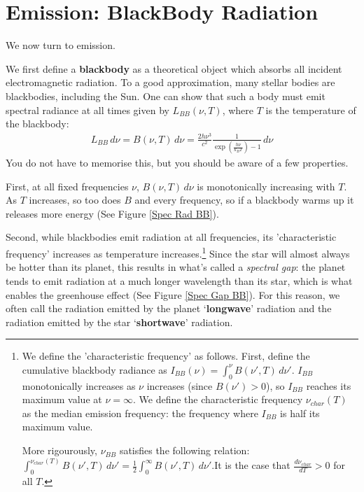 \section{Emission: BlackBody Radiation}

We now turn to emission.

We first define a \textbf{blackbody} as a theoretical object which absorbs all incident electromagnetic radiation. To a good approximation, many stellar bodies are blackbodies, including the Sun. One can show that such a body must emit spectral radiance at all times given by $L_{BB}(\nu,T)$, where $T$ is the temperature of the blackbody:
\begin{align}
    \boxed{L_{BB}\,d\nu=B(\nu,T)\,d\nu=\frac{2h\nu^3}{c^2}\frac{1}{\exp\left( \frac{h\nu}{k_BT} \right)-1}\,d\nu}
\end{align}
You do not have to memorise this, but you should be aware of a few properties. 

First, at all fixed frequencies $\nu$, $B(\nu,T)\,d\nu$ is monotonically increasing with $T$. As $T$ increases, so too does $B$ and every frequency, so if a blackbody warms up it releases more energy (See Figure \ref{Spec Rad BB}).

Second, while blackbodies emit radiation at all frequencies, its 'characteristic frequency' increases as temperature increases.\footnote{
    We define the 'characteristic frequency' as follows. First, define the cumulative blackbody radiance as $I_{BB}(\nu)=\int_0^\nu B(\nu',T)\,d\nu'$. $I_{BB}$ monotonically increases as $\nu$ increases (since $B(\nu')>0$), so $I_{BB}$ reaches its maximum value at $\nu=\infty$. We define the characteristic frequency $\nu_{char}(T)$ as the median emission frequency: the frequency where $I_{BB}$ is half its maximum value. 
    
    More rigourously, $\nu_{BB}$ satisfies the following relation: $\int_0^{\nu_{char}(T)} B(\nu',T)\,d\nu'=\frac{1}{2}\int_0^\infty B(\nu',T)\,d\nu'$.\footnotemark  It is the case that $\frac{d\nu_{char}}{dT}>0$ for all $T$.
} 
Since the star will almost always be hotter than its planet, this results in what's called a \textit{spectral gap}: the planet tends to emit radiation at a much longer wavelength than its star, which is what enables the greenhouse effect (See Figure \ref{Spec Gap BB}). For this reason, we often call the radiation emitted by the planet `\textbf{longwave}' radiation and the radiation emitted by the star `\textbf{shortwave}' radiation.


